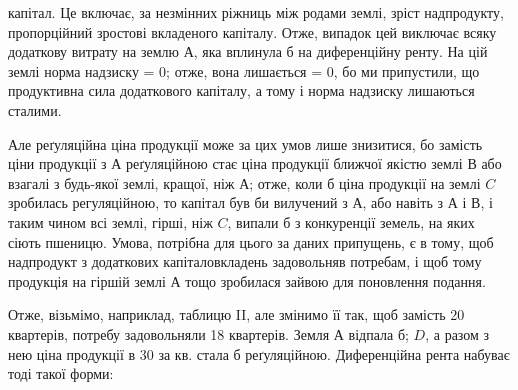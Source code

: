 \parcont{}  %
капітал. Це включає, за незмінних ріжниць між родами землі, зріст надпродукту,
пропорційний зростові вкладеного капіталу. Отже, випадок цей виключає всяку
додаткову витрату на землю $А$, яка вплинула б на диференційну ренту. На цій землі
норма надзиску = 0; отже, вона лишається = 0, бо ми припустили, що продуктивна
сила додаткового капіталу, а тому і норма надзиску лишаються сталими.

Але реґуляційна ціна продукції може за цих умов лише знизитися, бо замість
ціни продукції з $А$ реґуляційною стає ціна продукції ближчої якістю землі
$В$ або взагалі з будь-якої землі, кращої, ніж $А$; отже, коли б ціна продукції
на землі $C$ зробилась регуляційною, то капітал був би вилучений з $А$,
або навіть з $А$ і $В$, і таким чином всі землі, гірші, ніж $C$, випали б з конкуренції
земель, на яких сіють пшеницю. Умова, потрібна для цього за даних
припущень, є в тому, щоб надпродукт з додаткових капіталовкладень задовольняв
потребам, і щоб тому продукція на гіршій землі $А$ тощо зробилася
зайвою для поновлення подання.

Отже, візьмімо, наприклад, таблицю II, але змінимо її так, щоб замість 20
квартерів, потребу задовольняли 18 квартерів. Земля $А$ відпала б; $D$, а
разом з нею ціна продукції в 30 за кв. стала б реґуляційною. Диференційна
рента набуває тоді такої форми:

